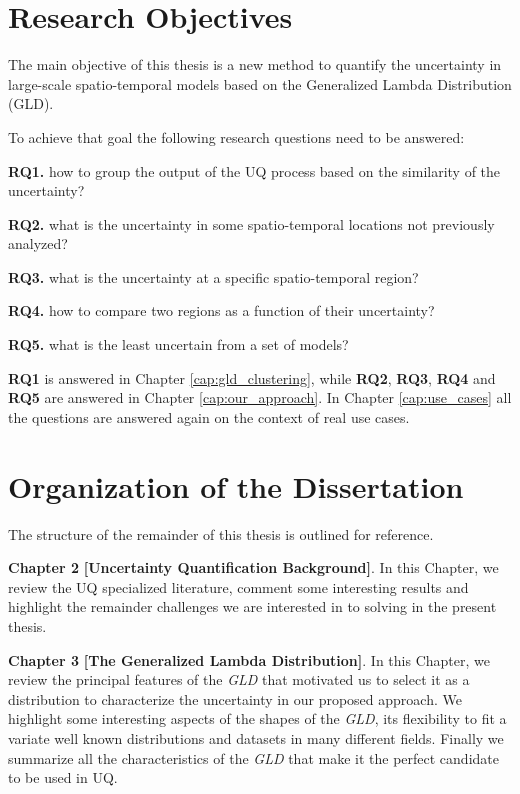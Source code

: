 \section{Research Objectives}

\begin{tcolorbox}
The main objective of this thesis is a new method to quantify the uncertainty in large-scale spatio-temporal models based on the Generalized Lambda Distribution (GLD).
\end{tcolorbox}

To achieve that goal the following research questions need to be answered:

\textbf{RQ1.} how to group the output of the UQ process based on the similarity of the uncertainty?

\textbf{RQ2.} what is the uncertainty in some spatio-temporal locations not previously analyzed?

\textbf{RQ3.} what is the uncertainty at a specific spatio-temporal region?

\textbf{RQ4.} how to compare two regions as a function of their uncertainty?

\textbf{RQ5.} what is the least uncertain from a set of models?

\textbf{RQ1} is answered in Chapter \ref{cap:gld_clustering}, while \textbf{RQ2}, \textbf{RQ3}, \textbf{RQ4} and \textbf{RQ5} are answered in Chapter \ref{cap:our_approach}. In Chapter \ref{cap:use_cases} all the questions are answered again on the context of real use cases.


\section{Organization of the Dissertation}

The structure of the remainder of this thesis is outlined for reference.

\textbf{Chapter 2} \textbf{[Uncertainty Quantification Background]}. In this Chapter, we review the UQ specialized literature, comment some interesting results and highlight the remainder challenges we are interested in to solving in the present thesis.

\textbf{Chapter 3} \textbf{[The Generalized Lambda Distribution]}. In this Chapter, we review the principal features of the \textit{GLD} that motivated us to select it as a distribution to characterize the uncertainty in our proposed approach. We highlight some interesting aspects of the shapes of the \textit{GLD}, its flexibility to fit a variate well known distributions and datasets in many different fields. Finally we summarize all the characteristics of the \textit{GLD} that make it the perfect candidate to be used in UQ. 

